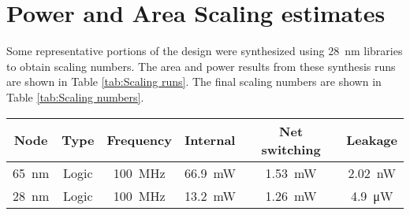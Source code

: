 \section{Power and Area Scaling estimates}
\label{sec:Power and Area Scaling estimates}

Some representative portions of the design were synthesized using \SI{28}{\nano\meter} libraries to obtain scaling numbers.
The area and power results from these synthesis runs are shown in Table \ref{tab:Scaling runs}.  The final scaling numbers are shown in Table \ref{tab:Scaling numbers}.

\begin{table}[h]
  \centering
  \captionsetup{justification=centering}

    \centering
    \begin{subtable}{0.65\textwidth}
        \begin{adjustbox}{width=1\textwidth}
            \footnotesize
            \begin{tabular}{ |c|c|c|c|c|c|  }
              \hline
          Node  &   Type & Frequency                              & Internal                & Net switching           & Leakage                  \\
              \hline
          \SI{65}{\nano\meter}  &  Logic &\SI[per-mode=symbol]{100}{\mega\hertz}  & \SI{66.9}{\milli\watt} & \SI{1.53}{\milli\watt} & \SI{2.02}{\nano\watt}  \\  %
          \SI{28}{\nano\meter}  &  Logic &\SI[per-mode=symbol]{100}{\mega\hertz}  & \SI{13.2}{\milli\watt} & \SI{1.26}{\milli\watt} & \SI{4.9 }{\micro\watt} \\  %

\end{tabular}
\end{adjustbox}
\end{subtable}
\end{table}
